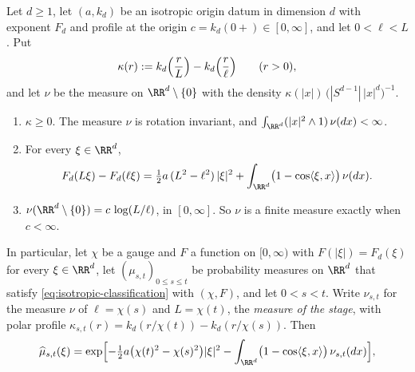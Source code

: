 \begin{lemma}
\label{lem:isotropic-stage-levy-measure}
\leanok
Let $d \ge 1$, let $(a, k_d)$ be an isotropic origin datum in dimension $d$ with exponent $F_d$
and profile at the origin $c = k_d(0{+}) \in [0,\infty]$, and let $0 < \ell < L$. Put
\[
  \kappa(r) := k_d\Bigl(\frac{r}{L}\Bigr) - k_d\Bigl(\frac{r}{\ell}\Bigr) \qquad (r > 0) ,
\]
and let $\nu$ be the measure on $\RR^d \setminus \{0\}$ with the density
$\kappa(|x|)\,\bigl(|S^{d-1}|\,|x|^d\bigr)^{-1}$.
\begin{enumerate}
\item $\kappa \ge 0$. The measure $\nu$ is rotation invariant, and
$\int_{\RR^d}(|x|^2 \wedge 1)\,\nu(dx) < \infty$.
\item For every $\xi \in \RR^d$,
\[
  F_d(L\xi) - F_d(\ell\xi) = \tfrac12 a\,(L^2 - \ell^2)\,|\xi|^2
     + \int_{\RR^d}\bigl(1 - \cos\langle\xi,x\rangle\bigr)\,\nu(dx) .
\]
\item $\nu(\RR^d \setminus \{0\}) = c\,\log(L/\ell)$, in $[0,\infty]$. So $\nu$ is a finite
measure exactly when $c < \infty$.
\end{enumerate}
In particular, let $\chi$ be a gauge and $F$ a function on $[0,\infty)$ with
$F(|\xi|) = F_d(\xi)$ for every $\xi \in \RR^d$, let $(\mu_{s,t})_{0 \le s \le t}$ be probability
measures on $\RR^d$ that satisfy \ref{eq:isotropic-classification} with $(\chi, F)$, and let
$0 < s < t$. Write $\nu_{s,t}$ for the measure $\nu$ of $\ell = \chi(s)$ and $L = \chi(t)$, the
\emph{\Levy{} measure of the stage}, with polar profile
$\kappa_{s,t}(r) = k_d(r/\chi(t)) - k_d(r/\chi(s))$. Then
\begin{equation}\label{eq:stage-transform}
  \widehat\mu_{s,t}(\xi) = \exp\Bigl[-\tfrac12 a\bigl(\chi(t)^2 - \chi(s)^2\bigr)|\xi|^2
     - \int_{\RR^d}\bigl(1 - \cos\langle\xi,x\rangle\bigr)\,\nu_{s,t}(dx)\Bigr],

\end{equation}
\end{lemma}

